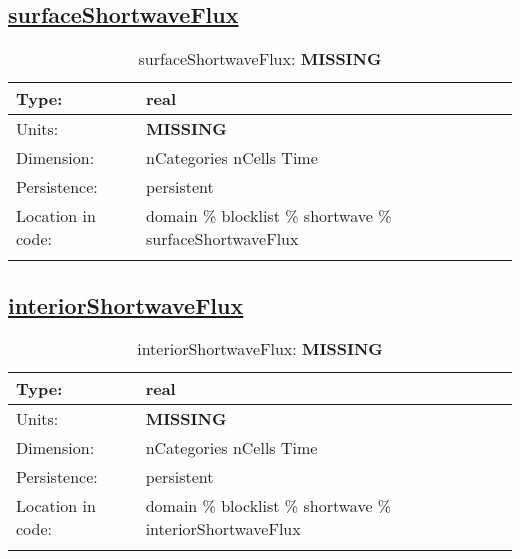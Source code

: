 \subsection[surfaceShortwaveFlux]{\hyperref[sec:var_tab_shortwave]{surfaceShortwaveFlux}}
\label{subsec:var_sec_shortwave_surfaceShortwaveFlux}
\begin{center}
\begin{longtable}{| p{2.0in} | p{4.0in} |}
        \hline 
        Type: & real \\
        \hline 
        Units: & {\bf \color{red} MISSING} \\
        \hline 
        Dimension: & nCategories nCells Time \\
        \hline 
        Persistence: & persistent \\
        \hline 
         Location in code: & domain \% blocklist \% shortwave \% surfaceShortwaveFlux \\
         \hline 
    \caption{surfaceShortwaveFlux: {\bf \color{red} MISSING}}
\end{longtable}
\end{center}
\subsection[interiorShortwaveFlux]{\hyperref[sec:var_tab_shortwave]{interiorShortwaveFlux}}
\label{subsec:var_sec_shortwave_interiorShortwaveFlux}
\begin{center}
\begin{longtable}{| p{2.0in} | p{4.0in} |}
        \hline 
        Type: & real \\
        \hline 
        Units: & {\bf \color{red} MISSING} \\
        \hline 
        Dimension: & nCategories nCells Time \\
        \hline 
        Persistence: & persistent \\
        \hline 
         Location in code: & domain \% blocklist \% shortwave \% interiorShortwaveFlux \\
         \hline 
    \caption{interiorShortwaveFlux: {\bf \color{red} MISSING}}
\end{longtable}
\end{center}

